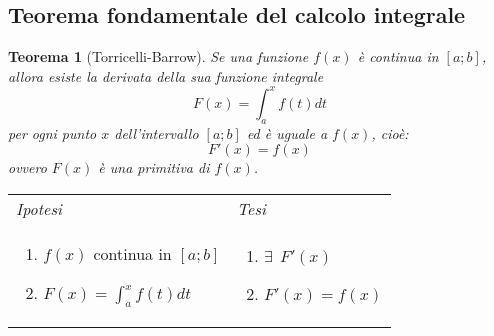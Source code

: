 \documentclass{article}     %
\newtheorem*{theorem}{Teorema}
\newenvironment{shadedTheorem}%
  {\begin{mdframed}[backgroundcolor=lightgray!40, linecolor=white, innertopmargin=4pt, innerbottommargin=13pt]\begin{theorem}}%
  {\end{theorem}\end{mdframed}}
\begin{document}
    \subsection{Teorema fondamentale del calcolo integrale}
        \begin{shadedTheorem}[Torricelli-Barrow]
            Se una funzione $f(x)$ è continua in $[a;b]$, allora esiste la derivata della sua funzione integrale
            \[F(x)=\int_a^x f(t)dt\]
            per ogni punto $x$ dell'intervallo $[a;b]$ ed è uguale a $f(x)$, cioè:
            \[F'(x)=f(x)\]
            ovvero $F(x)$ è una primitiva di $f(x)$.
        \end{shadedTheorem}
        \begin{tabular}{m{}m{}}
            \textit{Ipotesi} & \textit{Tesi}  \\
            \begin{enumerate}
                \item $f(x)$ continua in $[a;b]$
                \item $F(x)=\int_a^x f(t)dt$
            \end{enumerate} & 
            \begin{enumerate}
                \item $\exists~~ F'(x)$
                \item $F'(x)=f(x)$
            \end{enumerate}
        \end{tabular}
\end{document}
